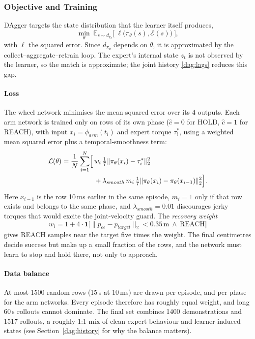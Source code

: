 \documentclass[conference]{IEEEtran}
\newcommand{\dagE}{\mathcal{E}}                        %
\newcommand{\dagPi}{\pi_\theta}                        %
\newcommand{\dagnorm}[1]{\lVert #1\rVert_2}            %
\newcommand{\dagone}{\mathbf{1}}                       %
\begin{document}
\subsubsection{Objective and Training}
\label{dag:train}

DAgger targets the state distribution that the learner itself produces,
\begin{equation}
  \min_{\theta}\ \mathbb{E}_{s\sim d_{\dagPi}}\bigl[\ \ell\bigl(\dagPi(s),\dagE(s)\bigr)\ \bigr],
  \label{dag:obj}
\end{equation}
with $\ell$ the squared error. Since $d_{\dagPi}$ depends on $\theta$, it is approximated by the collect--aggregate--retrain loop. The expert's internal state $z_t$ is not observed by the learner, so the match is approximate; the joint history \eqref{dag:lags} reduces this gap.

\paragraph{Loss} The wheel network minimises the mean squared error over its 4 outputs. Each arm network is trained only on rows of its own phase ($\hat c=0$ for HOLD, $\hat c=1$ for REACH), with input $x_i=\phi_{arm}(t_i)$ and expert torque $\tau_i^{*}$, using a weighted mean squared error plus a temporal-smoothness term:
\begin{equation}
\begin{aligned}
  \mathcal{L}(\theta)=\frac1N\sum_{i=1}^{N}\Bigl[\,&w_i\,\tfrac{1}{7}\dagnorm{\dagPi(x_i)-\tau_i^{*}}^{2}\\
  &+\lambda_{smooth}\,m_i\,\tfrac{1}{7}\dagnorm{\dagPi(x_i)-\dagPi(x_{i-1})}^{2}\Bigr].
\end{aligned}
\label{dag:loss}
\end{equation}
Here $x_{i-1}$ is the row 10\,ms earlier in the same episode, $m_i=1$ only if that row exists and belongs to the same phase, and $\lambda_{smooth}=0.01$ discourages jerky torques that would excite the joint-velocity guard. The \emph{recovery weight}
\begin{equation}
  w_i=1+4\cdot\dagone\bigl[\dagnorm{p_{ee}-p_{target}}<0.35\,\text{m}\ \wedge\ \text{REACH}\bigr]
  \label{dag:weight}
\end{equation}
gives REACH samples near the target five times the weight. The final centimetres decide success but make up a small fraction of the rows, and the network must learn to stop and hold there, not only to approach.

\paragraph{Data balance} At most 1500 random rows (15\,s at 10\,ms) are drawn per episode, and per phase for the arm networks. Every episode therefore has roughly equal weight, and long 60\,s rollouts cannot dominate. The final set combines 1400 demonstrations and 1517 rollouts, a roughly 1:1 mix of clean expert behaviour and learner-induced states (see Section~\ref{dag:history} for why the balance matters).
\end{document}
